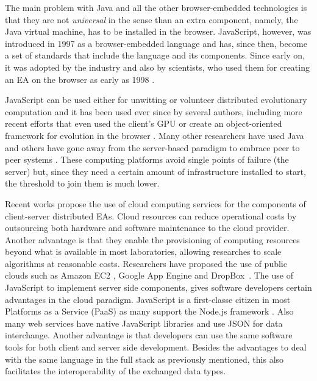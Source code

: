 \documentclass[journal,onecolumn]{IEEEtran}
\begin{document}
The main problem with Java and all the other browser-embedded
technologies is that they are not {\em universal} in the
sense than an extra component, namely, the Java virtual machine, has
to be installed in the browser. JavaScript, however,
\cite{flanagan2006javascript} was introduced in 1997 as a
browser-embedded language and has, since then, become a set of standards
\cite{ECMA-262} that include the language and its components. Since
early on, it was adopted by the industry and also by scientists,
who used them for creating an EA on
the browser as early as 1998 \cite{jj-ppsn98}. 

JavaScript can be used either for unwitting
\cite{unwitting-ec} or volunteer
\cite{langdon:2005:metas,gecco07:workshop:dcor} distributed
evolutionary computation and it has been used ever since by several
authors, including more recent efforts \cite{Desell:2008:AHG:1389095.1389273,duda2013distributed,DBLP:journals/corr/abs-0801-1210} that even
used the client's GPU \cite{duda2013gpu} or create an object-oriented
framework for evolution in the browser \cite{EvoStar2014:jsEO}. Many other researchers have
used Java \cite{chong:1999:jDGPi} and others have gone away from the
server-based paradigm to embrace peer to peer systems
\cite{jin2006constructing,10.1109/ICICSE.2008.99,DBLP:conf/3pgcic/GuervosMFEL12}. These computing
platforms avoid single points of failure (the server) but, since they
need a certain amount of infrastructure installed to start, the
threshold to join them is much lower. 

Recent works propose the use of cloud computing services for the components of 
client-server distributed EAs. Cloud resources 
can reduce operational costs by outsourcing both hardware and software maintenance 
to the cloud provider. Another advantage is that they enable the provisioning of computing resources beyond what 
is available in most laboratories, allowing researches to 
scale algorithms at reasonable costs. Researchers have proposed the use of 
public clouds such as Amazon EC2 \cite{CloudScale}, Google App Engine\cite{di2013towards} 
and DropBox~\cite{mericloud}. The use of JavaScript to implement server side components, %
gives software developers certain advantages in the cloud paradigm. JavaScript is a first-classe citizen
in most Platforms as a Service (PaaS) as many support the Node.js framework \cite{wood13:nodejs:paas}. Also many web services 
have native JavaScript libraries and use JSON for data interchange. Another advantage is that 
developers can use the same software tools for both client and server side development. 
Besides the advantages to deal with the same language in the full stack as previously mentioned, 
this also facilitates the interoperability of the exchanged data types.
\end{document}
